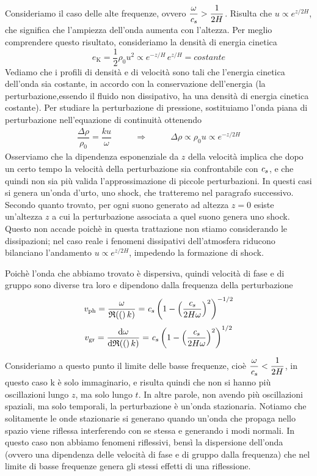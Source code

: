 Consideriamo il caso delle alte frequenze, ovvero $\dfrac{\omega}{\textit{c}_{s}} > \dfrac{1}{2H}$. Risulta che $u \propto e^{z/2H}$, che significa che l'ampiezza dell'onda aumenta con l'altezza. Per meglio comprendere questo risultato, consideriamo la densità di energia cinetica
\begin{equation}
e_\mathrm{K} = \dfrac{1}{2} \rho_0 u^2 \propto e^{-z/H} \, e^{z/H} = costante
\end{equation}
Vediamo che i profili di densità e di velocità sono tali che l'energia cinetica dell'onda sia costante, in accordo con la conservazione dell'energia (la perturbazione,essendo il fluido non dissipativo, ha una densità di energia cinetica costante).
Per studiare la perturbazione di pressione, sostituiamo l'onda piana di perturbazione nell'equazione di continuità ottenendo
\begin{align*}
\dfrac{\Delta \rho}{\rho_0} = \dfrac{k u}{\omega} \,\,\,\,\,\,\,\,\,\,\,\,\,\,\,\, \Longrightarrow \,\,\,\,\,\,\,\,\,\,\,\,\,\,\,\, \Delta \rho \propto \rho_0 u \propto e^{-z/2H}
\end{align*}
Osserviamo che la dipendenza esponenziale da $z$ della velocità implica che dopo un certo tempo la velocità della perturbazione sia confrontabile con $\textit{c}_{s}$, e che quindi non sia più valida l'approssimazione di piccole perturbazioni. In questi casi si genera un'onda d'urto, uno shock, che tratteremo nel paragrafo successivo. Secondo quanto trovato, per ogni suono generato ad altezza $z=0$ esiste un'altezza $z$ a cui la perturbazione associata a quel suono genera uno shock. Questo non accade poichè in questa trattazione non stiamo considerando le dissipazioni; nel caso reale i fenomeni dissipativi dell'atmosfera riducono bilanciano l'andamento $u \propto e^{z/2H}$, impedendo la formazione di shock.

Poichè l'onda che abbiamo trovato è dispersiva, quindi velocità di fase e di gruppo sono diverse tra loro e dipendono dalla frequenza della perturbazione
\begin{equation}
v_\mathrm{ph}=\dfrac{\omega}{\mathfrak{R}\!\left({(}\right)k)} = \textit{c}_{s} \left( 1- \left( \dfrac{\textit{c}_{s}}{2H\omega} \right)^2 \right)^{-1/2}
\end{equation}
\begin{equation}
v_\mathrm{gr}=\dfrac{\mathrm{d} {\omega}}{\mathrm{d} {\mathfrak{R}\!\left({(}\right)k)}} = \textit{c}_{s} \left( 1- \left( \dfrac{\textit{c}_{s}}{2H\omega} \right)^2 \right)^{1/2}
\end{equation}


Consideriamo a questo punto il limite delle basse frequenze, cioè $\dfrac{\omega}{\textit{c}_{s}} < \dfrac{1}{2H}$, in questo caso k è solo immaginario, e risulta quindi che non si hanno più oscillazioni lungo $z$, ma solo lungo $t$. In altre parole, non avendo più oscillazioni spaziali, ma solo temporali, la perturbazione è un'onda stazionaria. Notiamo che solitamente le onde stazionarie si generano quando un'onda che propaga nello spazio viene riflessa interferendo con se stessa e generando i modi normali. In questo caso non abbiamo fenomeni riflessivi, bensì la dispersione dell'onda (ovvero una dipendenza delle velocità di fase e di gruppo dalla frequenza) che nel limite di basse frequenze genera gli stessi effetti di una riflessione.


